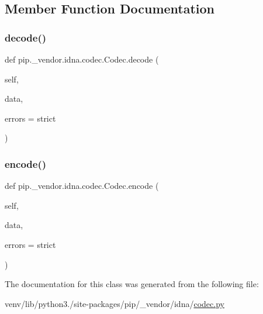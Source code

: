 \subsection{Member Function Documentation}
\mbox{\label{classpip_1_1__vendor_1_1idna_1_1codec_1_1Codec_a7567f9eeaeff74ca42779f632b51d205}} 
\subsubsection{\texorpdfstring{decode()}{decode()}}
{\footnotesize\ttfamily def pip.\+\_\+vendor.\+idna.\+codec.\+Codec.\+decode (\begin{DoxyParamCaption}\item[{}]{self,  }\item[{}]{data,  }\item[{}]{errors = {\ttfamily \textquotesingle{}strict\textquotesingle{}} }\end{DoxyParamCaption})}

\mbox{\label{classpip_1_1__vendor_1_1idna_1_1codec_1_1Codec_ab9b27b3765c83cd9dff0b49370b61c64}} 
\subsubsection{\texorpdfstring{encode()}{encode()}}
{\footnotesize\ttfamily def pip.\+\_\+vendor.\+idna.\+codec.\+Codec.\+encode (\begin{DoxyParamCaption}\item[{}]{self,  }\item[{}]{data,  }\item[{}]{errors = {\ttfamily \textquotesingle{}strict\textquotesingle{}} }\end{DoxyParamCaption})}



The documentation for this class was generated from the following file\+:\begin{DoxyCompactItemize}
\item 
venv/lib/python3./site-\/packages/pip/\+\_\+vendor/idna/\hyperlink{codec_8py}{codec.\+py}\end{DoxyCompactItemize}
